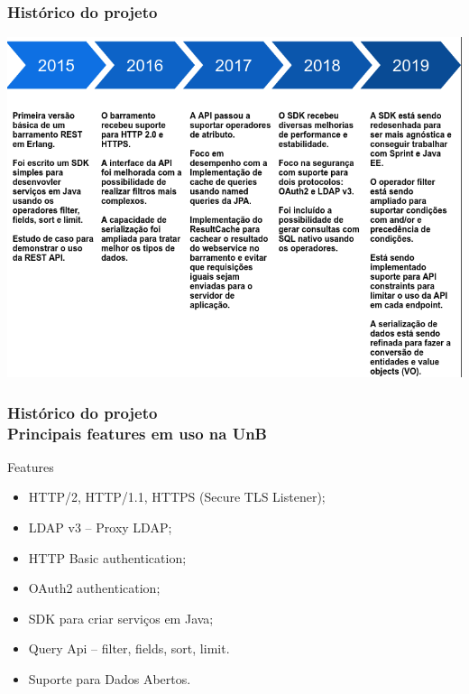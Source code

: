 \documentclass{beamer}
\begin{document}
\begin{frame}

	\frametitle{Histórico do projeto}

	\centering
	\includegraphics[scale=0.29]{img/historico.png}

\end{frame}



\begin{frame}
	\frametitle{Histórico do projeto \\ \small{Principais features em uso na UnB}}

\begin{exampleblock}{Features}
	
	\begin{itemize}
		\item<1->HTTP/2, HTTP/1.1, HTTPS (Secure TLS Listener);
		\item<1->LDAP v3 -- Proxy LDAP;
		\item<1->HTTP Basic authentication;
		\item<1->OAuth2 authentication;
		\item<1->SDK para criar serviços em Java;
		\item<1->Query Api -- filter, fields, sort, limit.
		\item<1->Suporte para Dados Abertos.
	\end{itemize}
	
\end{exampleblock}


\end{frame}
\end{document}
